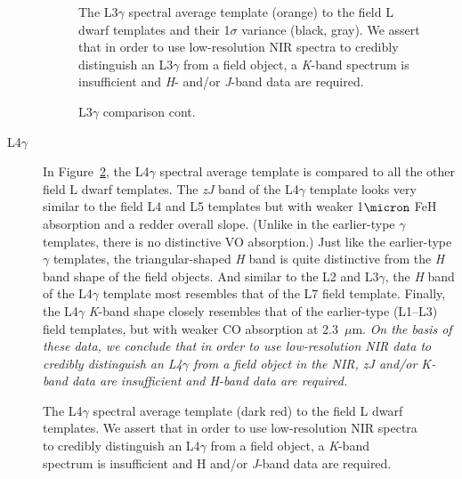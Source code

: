 \documentclass[modern,trackchanges]{aastex61}
\begin{document}
\begin{description}
\begin{figure}[b]
  \caption{The L3$\gamma$ spectral average template (orange) to the field L dwarf templates and their 1$\sigma$ variance (black, gray).
  We assert that in order to use low-resolution NIR spectra to credibly distinguish an L3$\gamma$ from a field object, a \emph{K}-band spectrum is insufficient and \emph{H}- and/or \emph{J}-band data are required.}
  \label{fig:L3lg-field}
\end{figure}

\begin{figure}
     \caption{L3$\gamma$ comparison cont.}
\end{figure}
\clearpage

\item[L4$\gamma$]{
In Figure~\ref{fig:L4lg-field}, the L4$\gamma$ spectral average template is compared to all the other field L dwarf templates.
The \emph{zJ} band of the L4$\gamma$ template looks very similar to the field L4 and L5 templates but with weaker 1$\micron$ FeH absorption and a redder overall slope. (Unlike in the earlier-type $\gamma$ templates, there is no distinctive VO absorption.)
Just like the earlier-type $\gamma$ templates, the triangular-shaped \emph{H} band is quite distinctive from the \emph{H} band shape of the field objects. And similar to the L2 and L3$\gamma$, the \emph{H} band of the L4$\gamma$ template most resembles that of the L7 field template.
Finally, the L4$\gamma$ \emph{K}-band shape closely resembles that of the earlier-type (L1--L3) field templates, but with weaker CO absorption at 2.3~$\mu$m.
\emph{On the basis of these data, we conclude that in order to use low-resolution NIR data to credibly distinguish an L4$\gamma$ from a field object in the NIR, \emph{zJ} and/or \emph{K}-band data are insufficient and \emph{H}-band data are required.}
}
\end{description}

\begin{figure}[b]
    \caption{The L4$\gamma$ spectral average template (dark red) to the field L dwarf templates.
    We assert that in order to use low-resolution NIR spectra to credibly distinguish an L4$\gamma$ from a field object, a \emph{K}-band spectrum is insufficient and H and/or \emph{J}-band data are required.}
    \label{fig:L4lg-field}
\end{figure}
\end{document}
